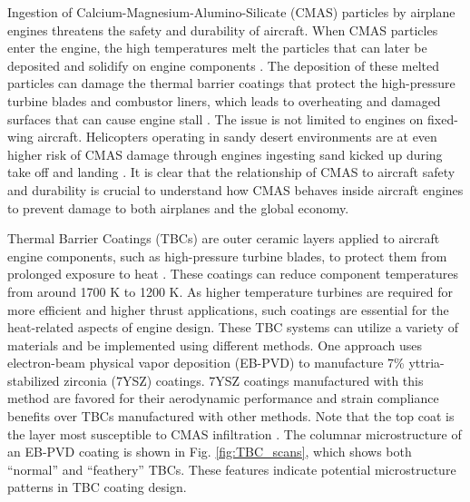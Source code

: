 \documentclass[%
 aip,
 amsmath,amssymb,
 reprint,%
floatfix]{revtex4-1}
\begin{document}
Ingestion of Calcium-Magnesium-Alumino-Silicate (CMAS) particles by airplane engines threatens the safety and durability of aircraft. 
When CMAS particles enter the engine, the high temperatures melt the particles that can later be deposited and solidify on engine components \cite{Chen2015}. The deposition of these melted particles can damage the thermal barrier coatings that protect the high-pressure turbine blades and combustor liners, which leads to overheating and damaged surfaces that can cause engine stall \cite{Chen2015}. The issue is not limited to engines on fixed-wing aircraft. Helicopters operating in sandy desert environments are at even higher risk of CMAS damage through engines ingesting sand kicked up during take off and landing \cite{Smialek}. 
It is clear that the relationship of CMAS to aircraft safety and durability is crucial to understand how CMAS behaves inside aircraft engines to prevent damage to both airplanes and the global economy.

Thermal Barrier Coatings (TBCs) are outer ceramic layers applied to aircraft engine components, such as high-pressure turbine blades, to protect them from prolonged exposure to heat \cite{Bennett2005}. These coatings can reduce component temperatures \cite{Sirigiri2018} from around 1700 K to 1200 K. As higher temperature turbines are required for more efficient and higher thrust applications, such coatings are essential for the heat-related aspects of engine design. 
These TBC systems can utilize a variety of materials and be implemented using different methods. One approach uses electron-beam physical vapor deposition (EB-PVD) to manufacture 7\% yttria-stabilized zirconia (7YSZ) coatings. 7YSZ coatings manufactured with this method are favored for their aerodynamic performance and strain compliance benefits over TBCs manufactured with other methods. Note that the top coat is the layer most susceptible to CMAS infiltration \cite{Renteria2007}. 
The columnar microstructure of an EB-PVD coating is shown in Fig. \ref{fig:TBC_scans}, which shows both ``normal'' and ``feathery'' TBCs. These features indicate potential microstructure patterns in TBC coating design. 
\end{document}
